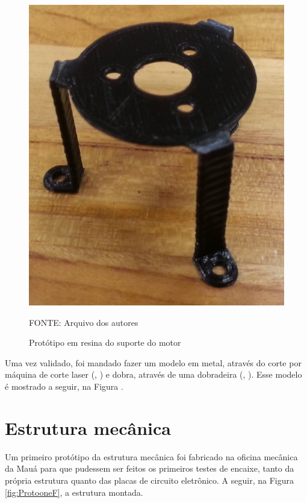 \documentclass[
	12pt,				%
	openany,			%
	twoside,			%
	a4paper,			%
	english,			%
	french,				%
	spanish,			%
	brazil,				%
	oldfontcommands
	]{abntex2}
\begin{document}

\begin{figure}[th]
	\caption{Protótipo em resina do suporte do motor}
	\centering
	\includegraphics[width=0.5\linewidth]{./figs/Proto_3D}
	
	\begin{small}
		FONTE: Arquivo dos autores
	\end{small}
	\label{fig:ProtoMSP}
\end{figure}


Uma vez validado, foi mandado fazer um modelo em metal, através do corte por máquina de corte laser (, ) e dobra, através de uma dobradeira (, ). Esse modelo é mostrado a seguir, na Figura .

%	

\section{Estrutura mecânica}

Um primeiro protótipo da estrutura mecânica foi fabricado na oficina mecânica da Mauá para que pudessem ser feitos os primeiros testes de encaixe, tanto da própria estrutura quanto das placas de circuito eletrônico. A seguir, na Figura \ref{fig:ProtooneF}, a estrutura montada.
\end{document}
